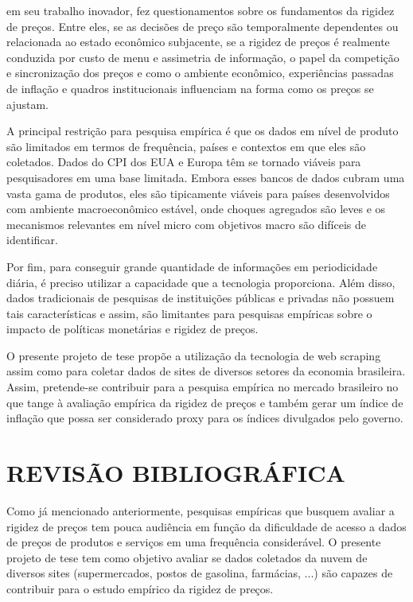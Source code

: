 \documentclass[twoside,a4paper,11pt]{report}
\begin{document}
\citet{cavallo2010scraped} em seu trabalho inovador, fez questionamentos sobre os fundamentos da rigidez de preços. Entre eles, se as decisões de preço são temporalmente dependentes ou relacionada ao estado econômico subjacente, se a rigidez de preços é realmente conduzida por custo de menu e assimetria de informação, o papel da competição e sincronização dos preços e como o ambiente econômico, experiências passadas de inflação e quadros institucionais influenciam na forma como os preços se ajustam.

A principal restrição para pesquisa empírica é que os dados em nível de produto são limitados em termos de frequência, países e contextos em que eles são coletados. Dados do CPI dos EUA e Europa têm se tornado viáveis para pesquisadores em uma base limitada. Embora esses bancos de dados cubram uma vasta gama de produtos, eles são tipicamente viáveis para países desenvolvidos com ambiente macroeconômico estável, onde choques agregados são leves e os mecanismos relevantes em nível micro com objetivos macro são difíceis de identificar. 

Por fim, para conseguir grande quantidade de informações em periodicidade diária, é preciso utilizar a capacidade que a tecnologia proporciona. Além disso, dados tradicionais de pesquisas de instituições públicas e privadas não possuem tais características e assim, são limitantes para pesquisas empíricas sobre o impacto de políticas monetárias e rigidez de preços.

O presente projeto de tese propõe a utilização da tecnologia de web scraping assim como \citet{cavallo2010scraped} para coletar dados de sites de diversos setores da economia brasileira. Assim, pretende-se contribuir para a pesquisa empírica no mercado brasileiro no que tange à avaliação empírica da rigidez de preços e também gerar um índice de inflação que possa ser considerado proxy para os índices divulgados pelo governo. 

\pagestyle{empty}
\cleardoublepage
\pagestyle{fancy}

\chapter{REVISÃO BIBLIOGRÁFICA}\label{cap2}

Como já mencionado anteriormente, pesquisas empíricas que busquem avaliar a rigidez de preços tem pouca audiência em função da dificuldade de acesso a dados de preços de produtos e serviços em uma frequência considerável. O presente projeto de tese tem como objetivo avaliar se dados coletados da nuvem de diversos sites (supermercados, postos de gasolina, farmácias, ...) são capazes de contribuir para o estudo empírico da rigidez de preços. 
\end{document}
